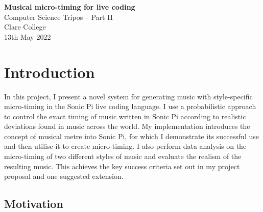 \documentclass[12pt,twoside,openright]{report}
\begin{document}

\begin{titlepage}
    \pagestyle{empty}


    \vspace*{60mm}
    \begin{center}
    \Huge
    \textbf{Musical micro-timing for live coding} \\[5mm]
    Computer Science Tripos -- Part II \\[5mm]
    Clare College \\[5mm]
    13th May 2022
    \end{center}
\end{titlepage}


\pagestyle{plain}

\tableofcontents


\pagestyle{headings}





\chapter{Introduction} \label{introduction}

In this project, I present a novel system for generating music with
style-specific micro-timing in the Sonic Pi live coding language. I
use a probabilistic approach to control the exact timing of music written in
Sonic Pi according to realistic deviations found in music across the world. My
implementation introduces the concept of musical metre into Sonic Pi, for which
I demonstrate its successful use and then utilise it to create micro-timing. I also
perform data analysis on the micro-timing of two different styles of music and
evaluate the realism of the resulting music. This achieves the key success
criteria set out in my project proposal and one suggested extension.



\section{Motivation} \label{motivation}
\end{document}
